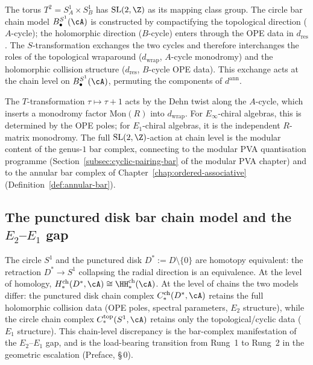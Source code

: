 \begin{remark}%
\label{rem:SL2Z-chain-level}%
%
%
The torus $T^2=S^1_A\times S^1_B$ has
$\mathrm{SL}(2,\Z)$ as its mapping class group.
The circle bar chain model
$B^{S^1}_\bullet(\cA)$ is constructed by
compactifying the topological direction ($A$-cycle);
the holomorphic direction ($B$-cycle) enters through
the OPE data in $d_{\mathrm{res}}$.
The $S$-transformation exchanges the two cycles
and therefore interchanges the roles of the
topological wraparound
($d_{\mathrm{wrap}}$, $A$-cycle monodromy)
and the holomorphic collision structure
($d_{\mathrm{res}}$, $B$-cycle OPE data).
This exchange acts at the chain level on
$B^{S^1}_\bullet(\cA)$, permuting the
components of $d^{\mathrm{ann}}$.

The $T$-transformation $\tau\mapsto\tau+1$
acts by the Dehn twist along the $A$-cycle,
which inserts a monodromy factor
$\mathrm{Mon}(R)$ into $d_{\mathrm{wrap}}$.
For $E_\infty$-chiral algebras, this is
determined by the OPE poles; for $E_1$-chiral
algebras, it is the independent $R$-matrix
monodromy.
The full $\mathrm{SL}(2,\Z)$-action at chain
level is the modular content of the
genus-$1$ bar complex, connecting to the
modular PVA quantisation programme
\textup{(}Section~\textup{\ref{subsec:cyclic-pairing-bar}}
of the modular PVA chapter\textup{)}
and to the annular bar complex of
Chapter~\textup{\ref{chap:ordered-associative}}
\textup{(}Definition~\textup{\ref{def:annular-bar}}\textup{)}.
\end{remark}

\subsection{\texorpdfstring{The punctured disk bar chain model and the $E_2$--$E_1$ gap}{The punctured disk bar chain model and the E2--E1 gap}}
\label{subsec:punctured-disk-bar}

The circle $S^1$ and the punctured disk
$D^*:=D\setminus\{0\}$ are homotopy equivalent: the
retraction $D^*\to S^1$ collapsing the radial direction
is an equivalence. At the level of homology,
$H^{\mathrm{ch}}_*(D^*,\cA)\cong\HH^{\mathrm{ch}}_*(\cA)$.
At the level of chains the two models differ:
the punctured disk chain complex
$C^{\mathrm{ch}}_*(D^*,\cA)$ retains the full
holomorphic collision data (OPE poles, spectral
parameters, $E_2$ structure), while the circle chain
complex $C^{\mathrm{top}}_*(S^1,\cA)$ retains only the
topological/cyclic data ($E_1$ structure).
This chain-level discrepancy is the bar-complex
manifestation of the $E_2$--$E_1$ gap, and is the load-bearing transition from Rung~1 to Rung~2 in the geometric escalation (Preface, \S\,0).

